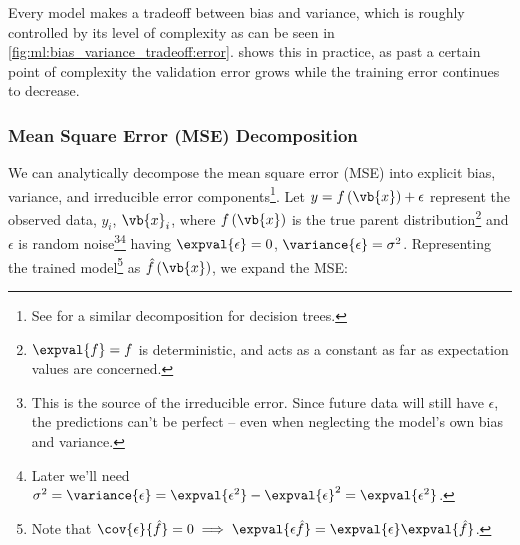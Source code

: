 Every model makes a tradeoff between bias and variance,
which is roughly controlled by its level of complexity
as can be seen in \cref{fig:ml:bias_variance_tradeoff:error}.
 shows this in practice,
as past a certain point of complexity the validation error grows
while the training error continues to decrease.

\subsubsection{Mean Square Error (MSE) Decomposition}
\label{ml_general:bias_variance_tradeoff:decop}

We can analytically decompose the mean square error (MSE) into explicit
bias, variance, and irreducible error components\footnote{See
\cite{pmlr-v151-shuo-tan22a} for a similar decomposition for decision trees.}.
Let $y = f\left(\vb{x}\right) + \epsilon$ represent
the observed data, $y_{i}$, $\vb{x}_{i}$,
where $f\left(\vb{x}\right)$ is the true parent distribution\footnote{$\expval{f} = f$ is deterministic,
and acts as a constant as far as expectation values are concerned.} and
$\epsilon$ is random noise\footnote{This is the source of the irreducible error.
Since future data will still have $\epsilon$, the predictions can't be perfect
-- even when neglecting the model's own bias and variance.}\footnote{Later we'll need
$\sigma^{2} = \variance{\epsilon} = \expval{\epsilon^{2}} - \expval{\epsilon}^{2} = \expval{\epsilon^{2}}$.} having
$\expval{\epsilon} = 0$, $\variance{\epsilon} = \sigma^{2}$.
Representing the trained model\footnote{Note
that $\cov{\epsilon}{\hat{f}} = 0 \implies \expval{\epsilon \hat{f}} = \expval{\epsilon} \expval{\hat{f}}$.} as
$\hat{f}\left(\vb{x}\right)$, we expand the MSE:

